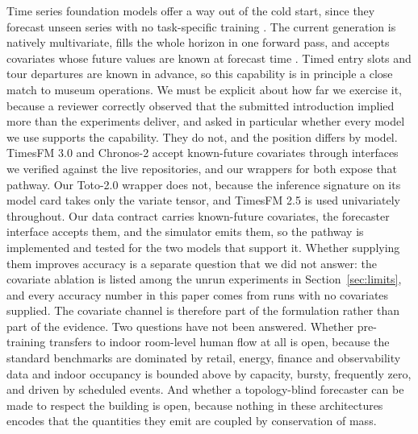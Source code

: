 \documentclass[11pt]{article}
\theoremstyle{plain}
\theoremstyle{definition}
\theoremstyle{remark}
\newif\ifrevisionmarkup
\newcommand{\new}[1]{\ifrevisionmarkup\textcolor{revision}{#1}\else#1\fi}
\begin{document}
Time series foundation models offer a way out of the cold start, since they forecast unseen series with no task-specific training \citep{das2024timesfm,ansari2024chronos,woo2024moirai}. The current generation is natively multivariate, fills the whole horizon in one forward pass, and accepts covariates whose future values are known at forecast time \citep{timesfm3,ansari2025chronos2,khwaja2026toto2}\new{. Timed entry slots and tour departures are known in advance, so this capability is in principle a close match to museum operations. We must be explicit about how far we exercise it, because a reviewer correctly observed that the submitted introduction implied more than the experiments deliver, and asked in particular whether every model we use supports the capability. They do not, and the position differs by model. TimesFM 3.0 and Chronos-2 accept known-future covariates through interfaces we verified against the live repositories, and our wrappers for both expose that pathway. Our Toto-2.0 wrapper does not, because the inference signature on its model card takes only the variate tensor, and TimesFM 2.5 is used univariately throughout. Our data contract carries known-future covariates, the forecaster interface accepts them, and the simulator emits them, so the pathway is implemented and tested for the two models that support it. Whether supplying them improves accuracy is a separate question that we did not answer: the covariate ablation is listed among the unrun experiments in Section~\ref{sec:limits}, and every accuracy number in this paper comes from runs with no covariates supplied. The covariate channel is therefore part of the formulation rather than part of the evidence}. Two questions have not been answered. Whether pre-training transfers to indoor room-level human flow at all is open, because the standard benchmarks are dominated by retail, energy, finance and observability data \citep{aksu2024gifteval} and indoor occupancy is bounded above by capacity, bursty, frequently zero, and driven by scheduled events. And whether a topology-blind forecaster can be made to respect the building is open, because nothing in these architectures encodes that the quantities they emit are coupled by conservation of mass.
\end{document}
